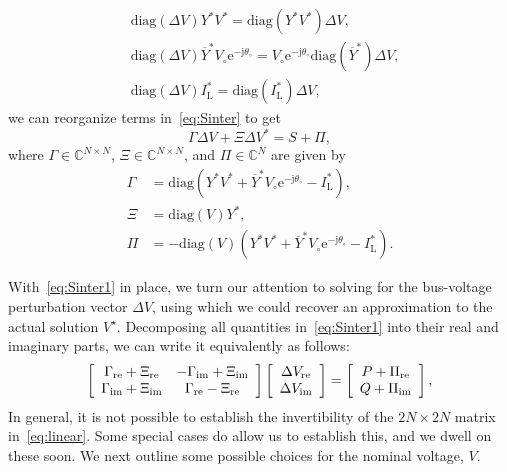 \documentclass[10 pt, conference]{ieeeconf}
\begin{document}
\begin{align}
&\mathrm{diag}\left(\Delta V\right) Y^* V^* = \mathrm{diag}\left(Y^* V^*\right)\Delta V, \nonumber \\
&\mathrm{diag}\left( \Delta V\right)\overline{Y}^* V_\circ \mathrm{e}^{-\mathrm j \theta_\circ} = V_\circ \mathrm{e}^{-\mathrm j \theta_\circ}\mathrm{diag}\left(\overline{Y}^*\right)\Delta V, \nonumber \\
&\mathrm{diag}\left(\Delta V\right) I_\mathrm{L}^* = \mathrm{diag}\left(I_\mathrm{L}^*\right) \Delta V, \nonumber 
\end{align}
we can reorganize terms in~\eqref{eq:Sinter} to get
\begin{equation} \label{eq:Sinter1}
\Gamma  \Delta V + \Xi \Delta V^* = S + \Pi,
\end{equation}
where $\Gamma \in \mathbb{C}^{N \times N}$, $\Xi \in \mathbb{C}^{N \times N}$, and $\Pi \in \mathbb{C}^N$ are given by
\begin{align} 
\Gamma &= \mathrm{diag}\left(Y^* V^* + \overline{Y}^* V_\circ \mathrm e^{-\mathrm j \theta_\circ} - I_\mathrm{L}^* \right), \label{eq:A}\\
\Xi &= \mathrm{diag}\left(V\right) Y^*, \label{eq:B} \\ 
\Pi &= -\mathrm{diag}\left(V\right) \left(Y^* V^*  + \overline{Y}^* V_\circ \mathrm e^{-\mathrm j \theta_\circ} - I_\mathrm{L}^*\right). \label{eq:C}
\end{align}

With~\eqref{eq:Sinter1} in place, we turn our attention to solving for the bus-voltage perturbation vector $\Delta V$, using which we could recover an approximation to the actual solution $V^\star$. Decomposing all quantities in~\eqref{eq:Sinter1} into their real and imaginary parts, we can write it equivalently as follows:
\begin{equation}
\left[ \begin{array}{c c} \Gamma_\mathrm{re}+\Xi_\mathrm{re} & -\Gamma_\mathrm{im}+\Xi_\mathrm{im} \\ \Gamma_\mathrm{im}+\Xi_\mathrm{im} & \Gamma_\mathrm{re}-\Xi_\mathrm{re} \end{array} \right]
\left[ \begin{array}{c} \Delta V_\mathrm{re} \\ \Delta V_\mathrm{im} \end{array} \right] = \left[ \begin{array}{c} P + \Pi_\mathrm{re}\\ Q + \Pi_\mathrm{im}\end{array} \right],
\label{eq:linear}
\end{equation}
In general, it is not possible to establish the invertibility of the $2N \times 2N$ matrix in~\eqref{eq:linear}. Some special cases do allow us to establish this, and we dwell on these soon. We next outline some possible choices for the nominal voltage, $V$. 
\end{document}
